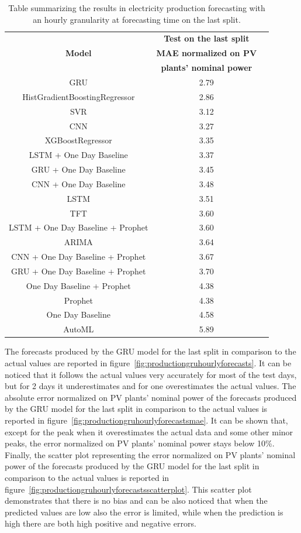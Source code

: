 \begin{table}[H]
\centering
\begin{tabular}{|c|c|c|}
\hline
 & \textbf{Test on the last split}\\
\textbf{Model} & \textbf{MAE normalized on PV}\\
 & \textbf{plants' nominal power}\\
\hline
GRU & 2.79\\
\hline
HistGradientBoostingRegressor & 2.86\\
\hline
SVR & 3.12\\
\hline
CNN & 3.27\\
\hline
XGBoostRegressor & 3.35\\
\hline
LSTM + One Day Baseline & 3.37\\
\hline
GRU + One Day Baseline & 3.45\\
\hline
CNN + One Day Baseline & 3.48\\
\hline
LSTM & 3.51\\
\hline
TFT & 3.60\\
\hline
LSTM + One Day Baseline + Prophet & 3.60\\
\hline
ARIMA & 3.64\\
\hline
CNN + One Day Baseline + Prophet & 3.67\\
\hline
GRU + One Day Baseline + Prophet & 3.70\\
\hline
One Day Baseline + Prophet & 4.38\\
\hline
Prophet & 4.38\\
\hline
One Day Baseline & 4.58\\
\hline
AutoML & 5.89\\
\hline
\end{tabular}
\caption{Table summarizing the results in electricity production forecasting with an hourly granularity at forecasting time on the last split.}
\label{tab:productionhourlyresultsforecast}
\end{table}

The forecasts produced by the GRU model for the last split in comparison to the actual values are reported in figure~\ref{fig:productiongruhourlyforecasts}.
It can be noticed that it follows the actual values very accurately for most of the test days, but for 2 days it underestimates and for one overestimates the actual values.
The absolute error normalized on PV plants' nominal power of the forecasts produced by the GRU model for the last split in comparison to the actual values is reported in figure~\ref{fig:productiongruhourlyforecastsmae}.
It can be shown that, except for the peak when it overestimates the actual data and some other minor peaks, the error normalized on PV plants' nominal power stays below 10\%.
Finally, the scatter plot representing the error normalized on PV plants' nominal power of the forecasts produced by the GRU model for the last split in comparison to the actual values is reported in figure~\ref{fig:productiongruhourlyforecastsscatterplot}.
This scatter plot demonstrates that there is no bias and can be also noticed that when the predicted values are low also the error is limited, while when the prediction is high there are both high positive and negative errors.

